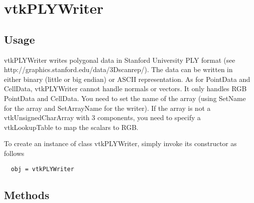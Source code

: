 \section{vtkPLYWriter}

\subsection{Usage}

 vtkPLYWriter writes polygonal data in Stanford University PLY format
 (see http://graphics.stanford.edu/data/3Dscanrep/). The data can be
 written in either binary (little or big endian) or ASCII representation.
 As for PointData and CellData, vtkPLYWriter cannot handle normals or
 vectors. It only handles RGB PointData and CellData. You need to set the
 name of the array (using SetName for the array and SetArrayName for the
 writer). If the array is not a vtkUnsignedCharArray with 3 components,
 you need to specify a vtkLookupTable to map the scalars to RGB.

To create an instance of class vtkPLYWriter, simply
invoke its constructor as follows
\begin{verbatim}
  obj = vtkPLYWriter
\end{verbatim}
\subsection{Methods}

